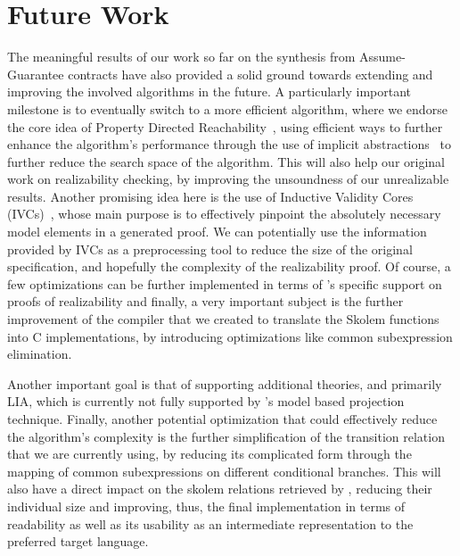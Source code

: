 \section{Future Work}
\label{sec:futurework}

The meaningful results of our work so far on the synthesis from Assume-Guarantee
contracts have also provided a solid ground towards extending and improving the
involved algorithms in the future. A particularly important milestone is to
eventually switch to a more efficient algorithm, where we endorse the core
idea of Property Directed Reachability~\cite{een2011efficient,bradley11},
using efficient ways to further enhance the algorithm's performance through the
use of implicit abstractions~\cite{cimatti2014ic3} to further reduce the search
space of the algorithm. This will also help our original work on realizability
checking, by improving the unsoundness of our unrealizable results. Another
promising idea here is the use of Inductive Validity Cores (IVCs)~\cite{Ghass16}, whose main purpose is to effectively pinpoint the absolutely necessary model elements in a generated proof. We can potentially use
the information provided by IVCs as a preprocessing tool to reduce the size of
the original specification, and hopefully the complexity of the realizability
proof. Of course, a few optimizations can be further implemented in terms of
\aeval's specific support on proofs of realizability and finally, a very
important subject is the further improvement of the compiler that we created to
translate the Skolem functions into C implementations, by introducing
optimizations like common subexpression elimination.

Another important goal is that of supporting additional theories, and primarily
LIA, which is currently not fully supported by \aeval's model based projection
technique. Finally, another potential optimization that could effectively reduce 
the algorithm's complexity is the further simplification of the transition
relation that we are currently using, by reducing its complicated form through the
mapping of common subexpressions on different conditional
branches. This will also have a direct impact on the skolem relations retrieved
by \aeval, reducing their individual size and improving, thus, the final
implementation in terms of readability as well as its usability as an
intermediate representation to the preferred target language.